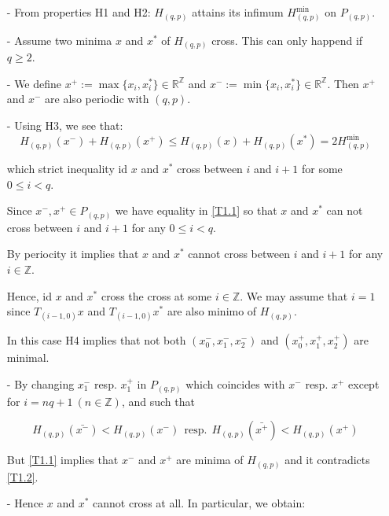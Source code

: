 \documentclass{article}
\begin{document}
	\begin{itemize}
		\item[-] From properties H1 and H2: $H_{(q, p)}$  attains its infimum $H_{(q, p)}^{\text{min}}$ on $P_{(q, p)}$. 
		\item[-] Assume two minima $x$ and $x^{*}$ of $H_{(q, p)}$ cross. This can only happend if $q \geq 2$.
		\item[-] We define $x^{+} := \max{ \{ x_i, x_{i}^{*} \} } \in \mathbb{R}^{\mathbb{Z}}$ and $x^{-} := \min{ \{ x_i, x_{i}^{*} \} } \in \mathbb{R}^{\mathbb{Z}}$. Then $x^{+}$ and $x^{-}$ are also periodic with $(q, p)$.
		\item[-] Using H3, we see that:
			\begin{equation} \label{T1.1}
				H_{(q, p)} (x^{-}) + H_{(q, p)} (x^{+}) \leq H_{(q, p)} (x) + H_{(q, p)} (x^{*}) = 2 H_{(q, p)}^{\text{min}}
			\end{equation}
			
			which strict inequality id $x$ and $x^{*}$ cross between $i$ and $i + 1$ for some $0 \leq i < q$. 
			
			Since $x^{-}, x^{+} \in P_{(q, p)}$ we have equality in \ref{T1.1} so that $x$ and $x^{*}$ can not cross between $i $ and $i+1$ for any $0 \leq i < q$.
			
			By periocity it implies that $x$ and $x^{*}$ cannot cross between $i$ and $i + 1$ for any $i \in \mathbb{Z}$.
			
			Hence, id $x$ and $x^{*}$ cross the cross at some $i \in \mathbb{Z}$. We may assume that $i = 1$ since $T_{(i - 1, 0)}x $ and $T_{(i - 1, 0)}x^{*}$ are also minimo of $H_{(q, p)}$. 
			
			In this case H4 implies that not both $(x_{0}^{-}, x_{1}^{-}, x_{2}^{-})$ and $(x_{0}^{+}, x_{1}^{+}, x_{2}^{+})$ are minimal. 
			
			\item[-] By changing $x_{1}^{-}$ resp. $x_{1}^{+}$ in $P_{(q, p)}$ which coincides with  $x^{-}$  resp. $x^{+}$ except for $i = nq + 1 \ (n \in \mathbb{Z})$, and such that
			
			\begin{equation} \label{T1.2}
				H_{(q, p)} ( \bar{x^{-}} ) < H_{(q, p)} (x^{-}) \ \ \text{resp.} \ \ H_{(q, p)} ( \bar{x^{+}} ) < H_{(q, p)} (x^{+})
			\end{equation}
			
			But \ref{T1.1} implies that $x^{-}$ and $x^{+}$ are minima of $H_{(q, p)}$ and it contradicts \ref{T1.2}.
			
			\item[-] Hence $x$ and $x^{*}$ cannot cross at all. In particular, we obtain:
			

\end{itemize}
\end{document}
